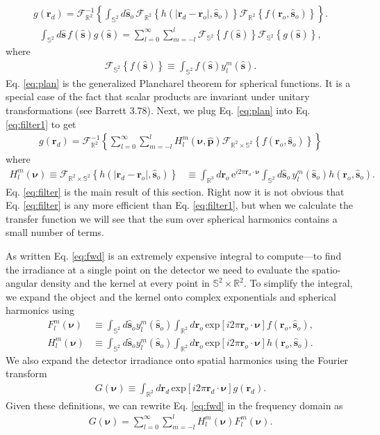 \documentclass{osa-article}
\newcommand{\me}{\mathrm{e}}
\providecommand{\mc}[1]{\mathcal{#1}}
\providecommand{\ro}{\mathbf{\mathbf{r}}_o}
\providecommand{\so}{\mathbf{\hat{s}}_o}
\providecommand{\rd}{\mathbf{r}_d}
\providecommand{\mh}[1]{\mathbf{\hat{#1}}}
\providecommand{\mbb}[1]{\mathbb{#1}}
\providecommand{\bs}[1]{\boldsymbol{#1}}
\providecommand{\bv}{\bs{\nu}}
\providecommand{\lmsum}{\sum_{l=0}^\infty\sum_{m=-l}^{l}}
\providecommand{\intr}[1]{\int_{\mbb{R}^{#1}}}
\providecommand{\ints}[1]{\int_{\mbb{S}^{#1}}}
\begin{document}
 \begin{align}
   g(\rd{}) = \mc{F}^{-1}_{\mbb{R}^2}\left\{\int_{\mbb{S}^2}d\so{}\, \mc{F}_{\mbb{R}^2}\left\{h(|\rd{} -\ro{}|, \so{})\right\}\mc{F}_{\mbb{R}^2}\left\{f(\ro, \so)\right\}\right\}.
 \end{align}
\begin{align}
  \ints{2}d\mh{s}{}\, f(\mh{s})g(\mh{s}) = \lmsum \mc{F}_{\mbb{S}^2}\left\{f(\mh{s})\right\}\mc{F}_{\mbb{S}^2}\left\{g(\mh{s})\right\}, \label{eq:plan}
\end{align}
where
\begin{align}
  \mc{F}_{\mbb{S}^2}\left\{f(\mh{s})\right\} \equiv \int_{\mbb{S}^2}f(\mh{s})y_l^m(\mh{s}).
\end{align}
Eq. \ref{eq:plan} is the generalized Plancharel theorem for spherical functions.
It is a special case of the fact that scalar products are invariant under
unitary transformations (see Barrett 3.78). Next, we plug Eq. \ref{eq:plan}
into Eq. \ref{eq:filter1} to get
\begin{align}
  g(\rd) = \mc{F}^{-1}_{\mbb{R}^2}\left\{\lmsum H_{l}^m(\bv, \mh{p}) \mc{F}_{\mbb{R}^2\times\mbb{S}^2}\left\{f(\ro, \so)\right\}\right\} \label{eq:filter}
\end{align}
where
\begin{align}
  H_{l}^m(\bv) \equiv \mc{F}_{\mbb{R}^2\times\mbb{S}^2}\left\{h(|\rd - \ro|, \so)\right\} &\equiv \intr{3}d\ro\, \me^{i2\pi\ro\cdot\bv}\ints{2}d\so\, y_l^m(\so) h(\ro, \so).\label{eq:transfer}
\end{align}
Eq. \ref{eq:filter} is the main result of this section. Right now it is not
obvious that Eq. \ref{eq:filter} is any more efficient than Eq.
\ref{eq:filter1}, but when we calculate the transfer function we will see that
the sum over spherical harmonics contains a small number of terms.


 
As written Eq. \ref{eq:fwd} is an extremely expensive integral to compute---to
find the irradiance at a single point on the detector we need to evaluate the
spatio-angular density and the kernel at every point in
$\mbb{S}^2\times \mbb{R}^2$. To simplify the integral, we expand the object and
the kernel onto complex exponentials and spherical harmonics using
\begin{align}
  F_l^m(\bs{\nu}) &\equiv \int_{\mbb{S}^2}d\so{}y_l^m(\so{})\int_{\mbb{R}^2}d\ro{}\,\text{exp}\left[i2\pi \ro{}\cdot\bs{\nu}\right]f(\ro{}, \so{}),\\
  H_l^m(\bs{\nu}) &\equiv \int_{\mbb{S}^2}d\so{}y_l^m(\so{})\int_{\mbb{R}^2}d\ro{}\,\text{exp}\left[i2\pi \ro{}\cdot\bs{\nu}\right]h(\ro{}, \so{}).
\end{align}
We also expand the detector irradiance onto spatial harmonics using the Fourier
transform
\begin{align}
  G(\bs{\nu}) \equiv \int_{\mbb{R}^2}d\rd{}\,\text{exp}\left[i2\pi \rd{}\cdot\bs{\nu}\right]g(\rd{}).
\end{align}
Given these definitions, we can rewrite Eq. \ref{eq:fwd} in the frequency domain as 
\begin{align}
G(\bs{\nu}) = \sum_{l=0}^{\infty}\sum_{m=-l}^{l}H_l^m(\bs{\nu})F_l^m(\bs{\nu}). 
\end{align}
\end{document}
